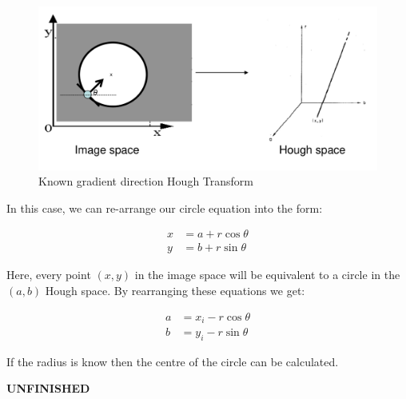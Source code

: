 \documentclass{article}
\begin{document}
\begin{figure}[ht]
  \centering
  \includegraphics[scale=0.3]{figures/l4-4.png}
  \caption{\label{fig:known-gd-ht} Known gradient direction Hough Transform}
\end{figure}

In this case, we can re-arrange our circle equation into the form:

\begin{align*}
  x &= a + r\cos \theta \\
  y &= b + r\sin \theta
\end{align*}

Here, every point $(x,y)$ in the image space will be equivalent to a circle in the $(a,b)$ Hough space. By rearranging these equations we get:

\begin{align*}
  a &= x_{i} - r\cos \theta\\
  b &= y_{i} - r\sin \theta
\end{align*}

If the radius is know then the centre of the circle can be calculated.

\textbf{UNFINISHED}
\end{document}
